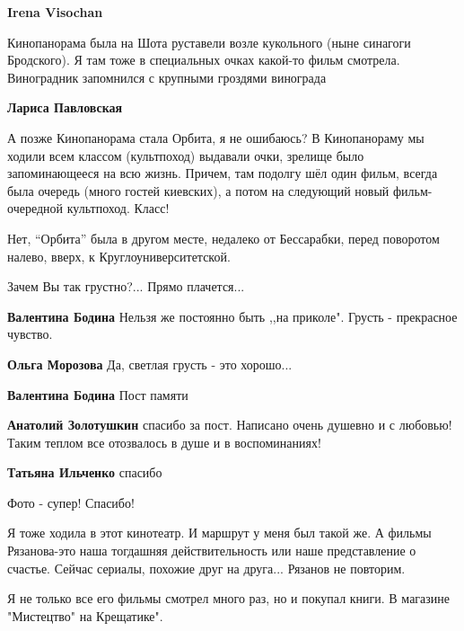 \begin{itemize}
\begin{itemize}
\begin{itemize}
\textbf{Irena Visochan} 

Кинопанорама была на Шота руставели возле кукольного (ныне синагоги Бродского).
Я там тоже в специальных очках какой-то фильм смотрела. Виноградник запомнился
с крупными гроздями винограда

\textbf{Лариса Павловская} 

А позже Кинопанорама стала Орбита, я не ошибаюсь? В Кинопанораму мы ходили всем
классом (культпоход) выдавали очки, зрелище было запоминающееся на всю
жизнь. Причем, там подолгу шёл один фильм, всегда была очередь (много гостей
киевских), а потом на следующий новый фильм-очередной культпоход. Класс!

\end{itemize} %


Нет, \enquote{Орбита} была в другом месте, недалеко от Бессарабки, перед поворотом
налево, вверх, к Круглоуниверситетской.

\end{itemize} %

Зачем Вы так грустно?... Прямо плачется...

\begin{itemize} %
\textbf{Валентина Бодина} Нельзя же постоянно быть ,,на приколе". Грусть - прекрасное чувство.

\textbf{Ольга Морозова} Да, светлая грусть - это хорошо...

\textbf{Валентина Бодина} Пост памяти

\textbf{Анатолий Золотушкин} спасибо за пост. Написано очень душевно и с любовью! Таким теплом все отозвалось в душе и в воспоминаниях!

\textbf{Татьяна Ильченко} спасибо
\end{itemize} %

Фото - супер! Спасибо!


Я тоже ходила в этот кинотеатр. И маршрут у меня был такой же. А фильмы
Рязанова-это наша тогдашняя действительность или наше представление о счастье.
Сейчас сериалы, похожие друг на друга... Рязанов не повторим.


Я не только все его фильмы смотрел много раз, но и покупал книги. В магазине
"Мистецтво" на Крещатике".


\end{itemize}
